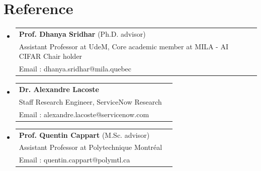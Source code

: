 \documentclass[letterpaper,11pt]{article}
\makeatletter
\newcommand{\resumeProjectHeading}[2]{
    \item
    \begin{tabular*}{0.97\textwidth}{l@{\extracolsep{\fill}}r}
      \small#1 & #2 \\
    \end{tabular*}\vspace{-7pt}
}
\newcommand{\resumeSubHeadingListStart}{\begin{itemize}[leftmargin=0.15in, label={}]}
\newcommand{\resumeSubHeadingListEnd}{\end{itemize}}
\makeatother
\begin{document}
\section{Reference}
 \resumeSubHeadingListStart
       \resumeProjectHeading
          {\textbf{Prof. Dhanya Sridhar}  (Ph.D. advisor)
            \\ Assistant Professor at UdeM, Core academic member at MILA - AI CIFAR Chair holder 
            \\ Email : dhanya.sridhar@mila.quebec}{}
       \resumeProjectHeading
          {\textbf{Dr. Alexandre Lacoste}
            \\ Staff Research Engineer, ServiceNow Research
            \\ Email : alexandre.lacoste@servicenow.com }{}
       \resumeProjectHeading
          {\textbf{Prof. Quentin Cappart}  (M.Sc. advisor)
\\ Assistant Professor at Polytechnique Montréal 
\\ Email : quentin.cappart@polymtl.ca }{}
    \resumeSubHeadingListEnd
\end{document}
